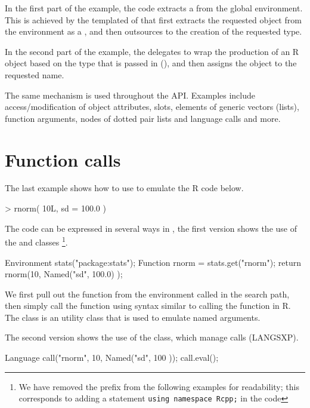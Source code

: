 In the first part of the example, the code extracts a 
 from the global environment. This is 
achieved by the templated  of 
that first extracts the requested object from the environment as a , 
and then outsources to  the creation of the 
requested type. 

In the second part of the example, the  
delegates to wrap the production of an R object based on the 
type that is passed in (), 
and then assigns the object to the requested name.

The same mechanism is used throughout the API. Examples include access/modification
of object attributes, slots, elements of generic vectors (lists), 
function arguments, nodes of dotted pair lists and language calls and more. 

\section{Function calls}

The last example shows how to use  to emulate the R code below.

\begin{example}
> rnorm( 10L, sd = 100.0 )
\end{example}

The code can be expressed in several ways in , the first version
shows the use of the  and  classes
\footnote{We have removed the  prefix from the following
  examples for readability; this corresponds to adding a statement
  \texttt{using namespace Rcpp;} in the code}.

\begin{example}
Environment stats("package:stats");
Function rnorm = stats.get("rnorm");
return rnorm(10, Named("sd", 100.0) );
\end{example}

We first pull out the  function from the environment 
called  in the search path, then simply call the function 
using syntax similar to calling the function in R. The  
class is an utility class that is used to emulate named arguments.

The second version shows the use of the  class, which 
manage calls (LANGSXP). 

\begin{example}
Language call("rnorm", 10, Named("sd", 100 ));
call.eval();
\end{example}

